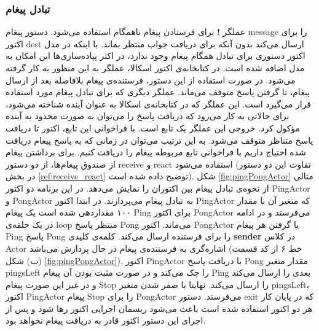 \subsubsection{تبادل پیغام}
\label{subsec:scala_message_passing}
عملگر \textbf{!} برای فرستادن پیغام ناهمگام استفاده می‌شود. دستور  پیغام message را برای اکتور dest ارسال می‌کند بدون آنکه برای دریافت جواب منتظر بماند. با اینکه در مدل اکتور دستوری برای تبادل همگام پیغام وجود ندارد، در اکثر پیاده‌سازی‌ها این امکان به مدل اضافه شده است\cite{ActorsJVM2009}. در کتابخانه‌ی اکتور اسکالا، عملگر  به این منظور به کار گرفته می‌شود. در صورت استفاده از این دستور، فرستنده‌ی پیغام بلافاصله بعد از ارسال پیغام، تا گرفتن پاسخ متوقف می‌ماند. عملگر دیگری که برای تبادل پیغام مورد استفاده قرار می‌گیرد \lr{!!} است. این عملگر که در کتابخانه‌ی اسکالا به عنوان \gls{آینده} شناخته می‌شود، برای حالاتی به کار می‌رود که دریافت پاسخ را می‌توان به صورت محدود به آینده مؤکول کرد. خروجی این عملگر یک تابع است. با فراخوانی این تابع، اکتور تا دریافت پاسخ متناظر متوقف می‌شود. به این ترتیب می‌توان  در زمانی که به پاسخ پیغام دریافت شده احتیاج داریم با فراخوانی تابع مربوطه پیغام را دریافت کنیم.
برای برداشتن پیغام از صندوق پیغام‌ها، از دو دستور receive و react استفاده می‌شود (تفاوت این دو دستور در بخش \ref{ref:receive_react} توضیح داده شده است). شکل \ref{fig:pingPongActor} مثالی از نحوه‌ی تبادل پیغام بین اکتوران را نمایش می‌دهد. در این برنامه دو اکتور PingActor و PongActor به تبادل پیغام می‌پردازند. در ابتدا اکتور PingActor که متغیر آن با مقدار ۱۰۰ مقداردهی شده است یک پیغام Ping برای اکتور PongActor می‌فرستد و در ادامه در یک حلقه‌ی loop منتظر پاسخ Pong می‌ماند. اکتور PongActor با گرفتن هر پیغام Ping پاسخ Pong را برای فرستنده ارسال می‌کند. کلمه‌ی کلیدی \textbf{sender} در کلاس Actor اشاره‌گری به فرستنده‌ی پیغام در حال پردازش ‌می‌باشد (خط ۶ از کد قسمت (ب) شکل \ref{fig:pingPongActor}). اکتور PingActor با دریافت پاسخ‌ Pong مقدار متغیر pingsLeft را چک می‌کند و در صورت مثبت بودن آن پیغام Ping بعدی را ارسال می‌کند و در غیر این صورت پیغام Stop را ارسال ‌می‌کند. نهایتا با صفر شدن متغیر pingsLeft، اکتور PingActor پیغام Stop را برای PongActor می‌فرستد. دستور exit که در پایان کار هر دو اکتور استفاده شده است باعث می‌شود ریسمان اجرایی اکتور رها شود و پس از اجرای این دستور اکتور قادر به دریافت پیغام نخواهد بود.

